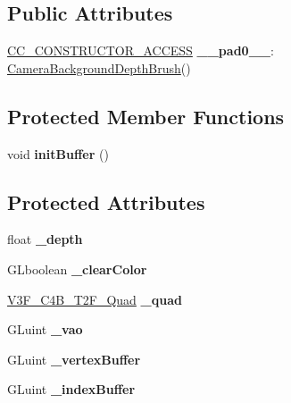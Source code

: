 \subsection*{Public Attributes}
\begin{DoxyCompactItemize}
\item 
\mbox{\label{classCameraBackgroundDepthBrush_ae580fab3c01da953fa27eec3efe2e5ce}} 
\hyperlink{_2cocos2d_2cocos_2base_2ccConfig_8h_a25ef1314f97c35a2ed3d029b0ead6da0}{C\+C\+\_\+\+C\+O\+N\+S\+T\+R\+U\+C\+T\+O\+R\+\_\+\+A\+C\+C\+E\+SS} {\bfseries \+\_\+\+\_\+pad0\+\_\+\+\_\+}\+: \hyperlink{classCameraBackgroundDepthBrush}{Camera\+Background\+Depth\+Brush}()
\end{DoxyCompactItemize}
\subsection*{Protected Member Functions}
\begin{DoxyCompactItemize}
\item 
\mbox{\label{classCameraBackgroundDepthBrush_aeae7334e2889d7fd72f76e7cd08679c7}} 
void {\bfseries init\+Buffer} ()
\end{DoxyCompactItemize}
\subsection*{Protected Attributes}
\begin{DoxyCompactItemize}
\item 
\mbox{\label{classCameraBackgroundDepthBrush_a95124d0322f572323ca7283df6cf2c78}} 
float {\bfseries \+\_\+depth}
\item 
\mbox{\label{classCameraBackgroundDepthBrush_af9d91bf9bc4f5d333a0f5c63d716e3ea}} 
G\+Lboolean {\bfseries \+\_\+clear\+Color}
\item 
\mbox{\label{classCameraBackgroundDepthBrush_ace782d7ccf4bd3a5880221810829eef1}} 
\hyperlink{structV3F__C4B__T2F__Quad}{V3\+F\+\_\+\+C4\+B\+\_\+\+T2\+F\+\_\+\+Quad} {\bfseries \+\_\+quad}
\item 
\mbox{\label{classCameraBackgroundDepthBrush_af15e219dbd14e2799c37971b11c81650}} 
G\+Luint {\bfseries \+\_\+vao}
\item 
\mbox{\label{classCameraBackgroundDepthBrush_a7abe1af4bd9a97dec50e28f2c1d26549}} 
G\+Luint {\bfseries \+\_\+vertex\+Buffer}
\item 
\mbox{\label{classCameraBackgroundDepthBrush_a9fa731a4bd5fd5406039e69bafc5bba3}} 
G\+Luint {\bfseries \+\_\+index\+Buffer}
\end{DoxyCompactItemize}
